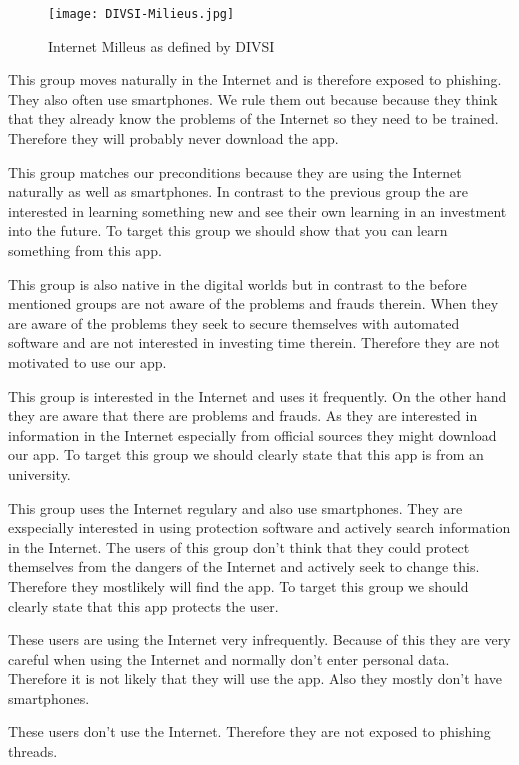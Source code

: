 \begin{figure}[hHtbp]
\centering
\texttt{[image: DIVSI-Milieus.jpg]}
\caption{Internet Milleus as defined by DIVSI \cite{divsi2012divsi}}
\label{fig:divsi_milieus}
\end{figure}

\begin{description}[leftmargin=0cm]
\item[Digital Souver\"{a}ne] This group moves naturally in the Internet and is therefore exposed to phishing. They also often use smartphones. We rule them out because because they think that they already know the problems of the Internet so they need to be trained. Therefore they will probably never download the app.
\item[Effizienzorientierte Performer] This group matches our preconditions because they are using the Internet naturally as well as smartphones. In contrast to the previous group the are interested in learning something new and see their own learning in an investment into the future. To target this group we should show that you can learn something from this app.
\item[Unbek\"{u}mmerte Hedonisten] This group is also native in the digital worlds but in contrast to the before mentioned groups are not aware of the problems and frauds therein. When they are aware of the problems they seek to secure themselves with automated software and are not interested in investing time therein. Therefore they are not motivated to use our app.
\item[Postmaterielle Skeptiker] This group is interested in the Internet and uses it frequently. On the other hand they are aware that there are problems and frauds. As they are interested in information in the Internet especially from official sources they might download our app. To target this group we should clearly state that this app is from an university.
\item[Verantwortungsbedachte Etablierte] This group uses the Internet regulary and also use smartphones. They are exspecially interested in using protection software and actively search information in the Internet. The users of this group don't think that they could protect themselves from the dangers of the Internet and actively seek to change this. Therefore they mostlikely will find the app. To target this group we should clearly state that this app protects the user.
\item[Ordnungsfordernde Internet-Laien] These users are using the Internet very infrequently. Because of this they are very careful when using the Internet and normally don't enter personal data. Therefore it is not likely that they will use the app. Also they mostly don't have smartphones.
\item[Internetferne Verunsicherte] These users don't use the Internet. Therefore they are not exposed to phishing threads.
\end{description}

